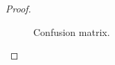 \documentclass[11pt]{article}
\newcommand{\1}{\mathbf{1}}
\begin{document}
{\begin{itemize}
\begin{proof}
\begin{figure}[htbp]
          \caption{Confusion matrix.\label{tf:confmat}}
        \end{figure}
      \end{proof}
\end{itemize}

\par}
\end{document}
